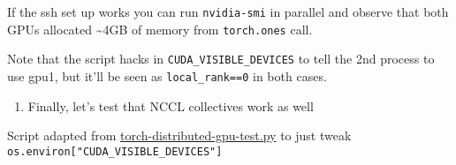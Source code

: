 \documentclass[
]{report}
\providecommand{\tightlist}{%
  \setlength{\itemsep}{0pt}\setlength{\parskip}{0pt}}\usepackage{longtable,booktabs,array}
\begin{document}
If the ssh set up works you can run \texttt{nvidia-smi} in parallel and
observe that both GPUs allocated \textasciitilde4GB of memory from
\texttt{torch.ones} call.

Note that the script hacks in \texttt{CUDA\_VISIBLE\_DEVICES} to tell
the 2nd process to use gpu1, but it'll be seen as
\texttt{local\_rank==0} in both cases.

\begin{enumerate}
\def\labelenumi{\arabic{enumi}.}
\setcounter{enumi}{4}
\tightlist
\item
  Finally, let's test that NCCL collectives work as well
\end{enumerate}

Script adapted from
\href{../debug/torch-distributed-gpu-test.py}{torch-distributed-gpu-test.py}
to just tweak \texttt{os.environ{[}"CUDA\_VISIBLE\_DEVICES"{]}}
\end{document}
